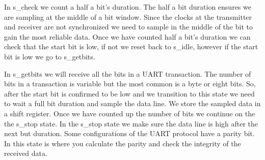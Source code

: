 In s\_check we count a half a bit's duration. The half a bit duration ensures we are sampling at the middle of a bit window. Since the clocks at the transmitter and receiver are not synchronized we need to sample in the middle of the bit to gain the most reliable data. Once we have counted half a bit's duration we can check that the start bit is low, if not we reset back to s\_idle, however if the start bit is low we go to s\_getbits.

In s\_getbits we will receive all the bits in a \ac{UART} transaction. The number of bits in a transaction is variable but the most common is a byte or eight bits. So, after the start bit is confirmed to be low and we transition to this state we need to wait a full bit duration and sample the data line. We store the sampled data in a shift register. Once we have counted up the number of bits we continue on the the s\_stop state. In the s\_stop state we make sure the data line is high after the next but duration. Some configurations of the \ac{UART} protocol have a parity bit. In this state is where you calculate the parity and check the integrity of the received data. 


